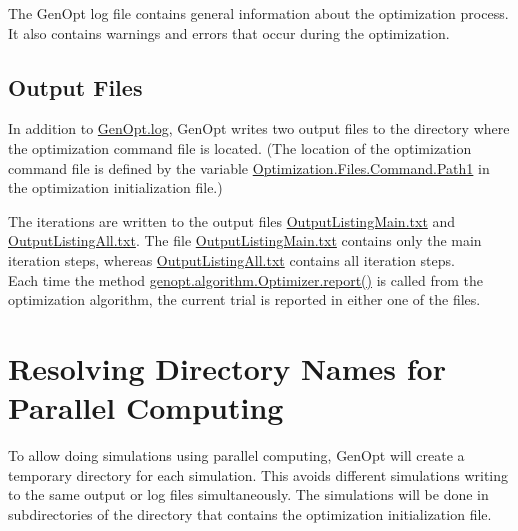 The GenOpt log file contains general information about the optimization process. It also contains warnings and errors that occur during the optimization.\\

\subsection{Output Files}
In addition to \url{GenOpt.log}, GenOpt writes two output files to the directory
where the optimization command file is located.
(The location of the optimization command file is defined by 
the variable \url{Optimization.Files.Command.Path1} in the optimization initialization file.)

The iterations are written to the output files 
\url{OutputListingMain.txt} 
and \url{OutputListingAll.txt}.
The file \url{OutputListingMain.txt} contains only the main iteration steps,
whereas \url{OutputListingAll.txt} contains all iteration steps.\\

Each time the method \url{genopt.algorithm.Optimizer.report()}
is called from the optimization algorithm, 
the current trial is reported in either one of the files.

\section{Resolving Directory Names for Parallel Computing}
To allow doing simulations using parallel computing, GenOpt will create a
temporary directory for each simulation.
This avoids different simulations writing to the
same output or log files simultaneously. 
The simulations will be done in subdirectories of the 
directory that contains the optimization initialization file. 


